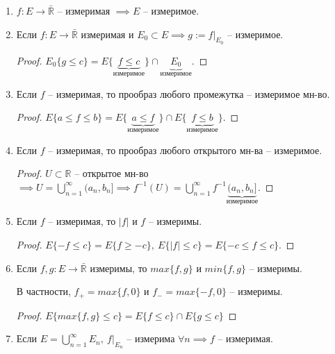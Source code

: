 \begin{properties}
    \begin{enumerate}
        \item {
            $f: E \rightarrow \bar{\mathbb{R}}$ -- измеримая $\implies E$ -- измеримое.
        }
        \item {
            Если $f: E \rightarrow \bar{\mathbb{R}}$ измеримая и $E_0 \subset E \implies g := f |_{E_0}$ -- измеримое.

            \begin{proof}
                $E_0\{ g \leq c \} = E \{ \underbrace{f \leq c}_{\text{измеримое}} \} \cap \underbrace{E_0}_{\text{измеримое}}$.
            \end{proof}
        }
        \item {
            Если $f$ -- измеримая, то прообраз любого промежутка -- измеримое мн-во.

            \begin{proof}
                $E\{ a \leq f \leq b \} = E\{ \underbrace{a \leq f}_{\text{измеримое}} \} \cap E\{\underbrace{f \leq b}_{\text{измеримое}}\}$.
            \end{proof}
        }
        \item {
            Если $f$ -- измеримая, то прообраз любого открытого мн-ва -- измеримое.

            \begin{proof}
                $U \subset \mathbb{R}$ -- открытое мн-во $\implies U = \bigcup_{n=1}^{\infty} (a_n, b_n] \implies f^{-1}(U) = \bigcup_{n=1}^{\infty} f^{-1}\underbrace{(a_n, b_n]}_{\text{измеримое}}$.
            \end{proof}
        }
        \item {
            Если $f$ -- измеримая, то $|f|$ и $f$ -- измеримы.

            \begin{proof}
                $E \{ -f \leq c \} = E \{ f \geq -c \}, \ E \{ |f| \leq c \} = E \{ -c \leq f \leq c \}$.
            \end{proof}
        }
        \item {
            Если $f, g: E \rightarrow \bar{\mathbb{R}}$ измеримы, то $max\{ f, g \}$ и $min \{ f, g \}$ -- измеримы.

            В частности, $f_+ = max\{ f, 0 \} $ и $f_- = max\{ -f, 0 \}$ -- измеримы.

            \begin{proof}
                $E \{ max \{ f, g \} \leq c \} = E \{ f \leq c \} \cap E \{ g \leq c \}$
            \end{proof}
        }
        \item {
            Если $E = \bigcup_{n=1}^{\infty}E_n, \ f|_{E_n}$ -- измерима $\forall n \implies f$ -- измеримая.

}
\end{enumerate}
\end{properties}
